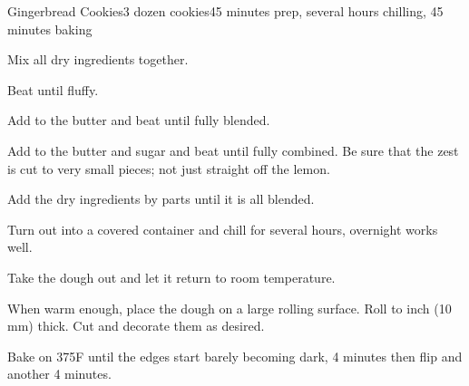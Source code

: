 \documentclass[../Cookbook.tex]{subfiles}
\begin{document}
\begin{recipe}{Gingerbread Cookies}{3 dozen cookies}{45 minutes prep, several hours chilling, 45 minutes baking}

	Mix all dry ingredients together.

	Beat until fluffy.

	Add to the butter and beat until fully blended.

	Add to the butter and sugar and beat until fully combined. Be sure that the zest is cut to very small pieces; not just straight off the lemon. %

	Add the dry ingredients by parts until it is all blended.

	Turn out into a covered container and chill for several hours, overnight works well.

	\newstep
	Take the dough out and let it return to room temperature.

	When warm enough, place the dough on a large rolling surface.
	Roll to  inch (10 mm) thick.
	Cut and decorate them as desired.

	\newstep
	Bake on 375\0F until the edges start barely becoming dark,
	4 minutes then flip and another 4 minutes.


\end{recipe}
\end{document}
